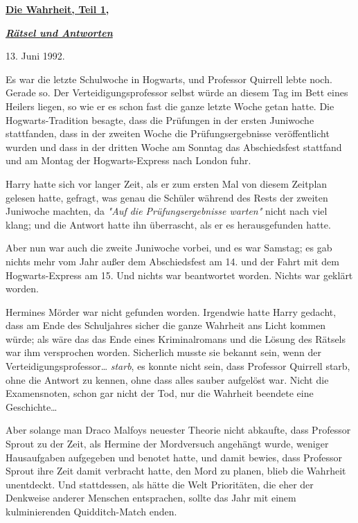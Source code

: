 

\hypertarget{die-wahrheit-teil-1}{%

\textbf{\uline{Die Wahrheit, Teil 1,}}

\textbf{\emph{\uline{Rätsel und Antworten}}}

13. Juni 1992.

Es war die letzte Schulwoche in Hogwarts, und Professor Quirrell lebte noch. Gerade so. Der Verteidigungsprofessor selbst würde an diesem Tag im Bett eines Heilers liegen, so wie er es schon fast die ganze letzte Woche getan hatte. Die Hogwarts-Tradition besagte, dass die Prüfungen in der ersten Juniwoche stattfanden, dass in der zweiten Woche die Prüfungsergebnisse veröffentlicht wurden und dass in der dritten Woche am Sonntag das Abschiedsfest stattfand und am Montag der Hogwarts-Express nach London fuhr.

Harry hatte sich vor langer Zeit, als er zum ersten Mal von diesem Zeitplan gelesen hatte, gefragt, was genau die Schüler während des Rests der zweiten Juniwoche machten, da \emph{"Auf die Prüfungsergebnisse warten"} nicht nach viel klang; und die Antwort hatte ihn überrascht, als er es herausgefunden hatte.

Aber nun war auch die zweite Juniwoche vorbei, und es war Samstag; es gab nichts mehr vom Jahr außer dem Abschiedsfest am 14. und der Fahrt mit dem Hogwarts-Express am 15. Und nichts war beantwortet worden. Nichts war geklärt worden.

Hermines Mörder war nicht gefunden worden. Irgendwie hatte Harry gedacht, dass am Ende des Schuljahres sicher die ganze Wahrheit ans Licht kommen würde; als wäre das das Ende eines Kriminalromans und die Lösung des Rätsels war ihm versprochen worden. Sicherlich musste sie bekannt sein, wenn der Verteidigungsprofessor… \emph{starb}, es konnte nicht sein, dass Professor Quirrell starb, ohne die Antwort zu kennen, ohne dass alles sauber aufgelöst war. Nicht die Examensnoten, schon gar nicht der Tod, nur die Wahrheit beendete eine Geschichte…

Aber solange man Draco Malfoys neuester Theorie nicht abkaufte, dass Professor Sprout zu der Zeit, als Hermine der Mordversuch angehängt wurde, weniger Hausaufgaben aufgegeben und benotet hatte, und damit bewies, dass Professor Sprout ihre Zeit damit verbracht hatte, den Mord zu planen, blieb die Wahrheit unentdeckt. Und stattdessen, als hätte die Welt Prioritäten, die eher der Denkweise anderer Menschen entsprachen, sollte das Jahr mit einem kulminierenden Quidditch-Match enden.

}
